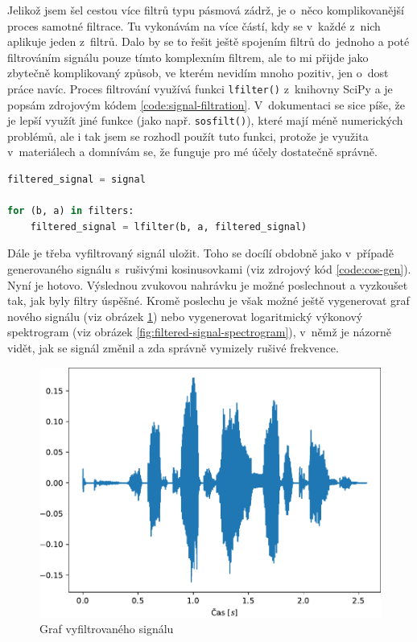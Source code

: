 \documentclass[a4paper, 11pt, final]{article}
\begin{document}
Jelikož jsem šel cestou více filtrů typu pásmová zádrž, je o~něco komplikovanější proces samotné filtrace. Tu vykonávám na více částí, kdy se v~každé z~nich aplikuje jeden z~filtrů. Dalo by se to řešit ještě spojením filtrů do~jednoho a poté filtrováním signálu pouze tímto komplexním filtrem, ale to mi přijde jako zbytečně komplikovaný způsob, ve kterém nevidím mnoho pozitiv, jen o~dost práce navíc. Proces filtrování využívá funkci \texttt{lfilter()} z~knihovny SciPy \cite{scipy-reference} a je popsám zdrojovým kódem \ref{code:signal-filtration}. V~dokumentaci se sice píše, že je lepší využít jiné funkce (jako např. \texttt{sosfilt()}), které mají méně numerických problémů, ale i tak jsem se rozhodl použít tuto funkci, protože je využita v~materiálech \cite{zmolikova-demo} a domnívám se, že funguje pro mé účely dostatečně správně.

\begin{lstlisting}[language=Python, caption=Výsledná filtrace zadaného signálu, label={code:signal-filtration}]
filtered_signal = signal

for (b, a) in filters:
    filtered_signal = lfilter(b, a, filtered_signal)
\end{lstlisting}

Dále je třeba vyfiltrovaný signál uložit. Toho se docílí obdobně jako v~případě generovaného signálu s~rušivými kosinusovkami (viz zdrojový kód \ref{code:cos-gen}). Nyní je hotovo. Výslednou zvukovou nahrávku je možné poslechnout a vyzkoušet tak, jak byly filtry úspěšné. Kromě poslechu je však možné ještě vygenerovat graf nového signálu (viz obrázek \ref{fig:filtered-signal-graph}) nebo vygenerovat logaritmický výkonový spektrogram (viz obrázek \ref{fig:filtered-signal-spectrogram}), v~němž je názorně vidět, jak se signál změnil a zda správně vymizely rušivé frekvence.

\begin{figure}[ht]
    \centering
    \includegraphics{img/10-filtered-signal.pdf}
    \caption{Graf vyfiltrovaného signálu}
    \label{fig:filtered-signal-graph}
\end{figure}
\end{document}
